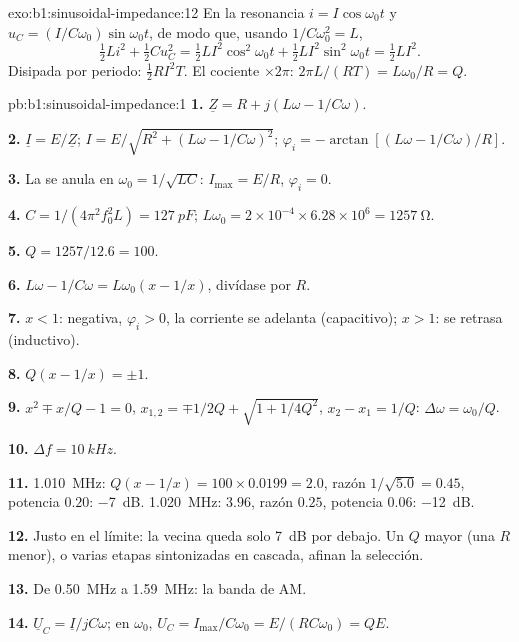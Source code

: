 \begin{solution}{exo:b1:sinusoidal-impedance:12}
En la resonancia $i = I\cos\omega_0 t$ y $u_C = (I/C\omega_0)\sin\omega_0 t$,
de modo que, usando $1/C\omega_0^2 = L$,
\[
\tfrac12 Li^2 + \tfrac12 Cu_C^2 = \tfrac12 LI^2\cos^2\omega_0 t
+ \tfrac12 LI^2\sin^2\omega_0 t = \tfrac12 LI^2 .
\]
Disipada por periodo: $\tfrac12 RI^2T$. El cociente $\times 2\pi$: $2\pi L/(RT)
= L\omega_0/R = Q$.
\end{solution}

\begin{solution}{pb:b1:sinusoidal-impedance:1}
\textbf{1.} $\underline Z = R + j(L\omega - 1/C\omega)$.

\textbf{2.} $\underline I = E/\underline Z$; $I = E/\sqrt{R^2 + (L\omega -
1/C\omega)^2}$; $\varphi_i = -\arctan[(L\omega - 1/C\omega)/R]$.

\textbf{3.} La  se anula en $\omega_0 = 1/\sqrt{LC}$: $I_{\max}
= E/R$, $\varphi_i = 0$.

\textbf{4.} $C = 1/(4\pi^2f_0^2L) = \qty{127}{pF}$; $L\omega_0 = 2\times10^{-4}
\times 6.28\times10^6 = \qty{1257}{\ohm}$.

\textbf{5.} $Q = 1257/12.6 = 100$.

\textbf{6.} $L\omega - 1/C\omega = L\omega_0(x - 1/x)$, divídase por $R$.

\textbf{7.} $x < 1$:  negativa, $\varphi_i > 0$, la corriente se
adelanta (capacitivo); $x > 1$: se retrasa (inductivo).

\textbf{8.} $Q(x - 1/x) = \pm1$.

\textbf{9.} $x^2 \mp x/Q - 1 = 0$, $x_{1,2} = \mp1/2Q + \sqrt{1 + 1/4Q^2}$,
$x_2 - x_1 = 1/Q$: $\Delta\omega = \omega_0/Q$.

\textbf{10.} $\Delta f = \qty{10}{kHz}$.

\textbf{11.} \qty{1.010}{MHz}: $Q(x - 1/x) = 100 \times 0.0199 = 2.0$,
razón $1/\sqrt{5.0} = 0.45$, potencia $0.20$: \qty{-7}{dB}. \qty{1.020}{MHz}:
$3.96$, razón $0.25$, potencia $0.06$: \qty{-12}{dB}.

\textbf{12.} Justo en el límite: la vecina queda solo \qty{7}{dB} por
debajo. Un $Q$ mayor (una $R$ menor), o varias etapas sintonizadas en
cascada, afinan la selección.

\textbf{13.} De \qty{0.50}{MHz} a \qty{1.59}{MHz}: la banda de AM.

\textbf{14.} $\underline U_C = \underline I/jC\omega$; en $\omega_0$,
$U_C = I_{\max}/C\omega_0 = E/(RC\omega_0) = QE$.


\end{solution}
